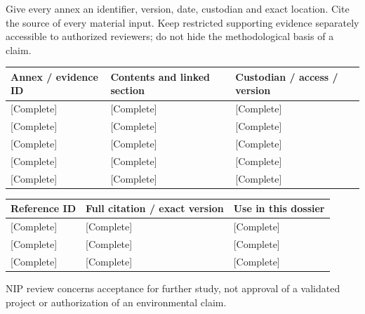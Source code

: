 \begin{Notice}Give every annex an identifier, version, date, custodian and exact location. Cite the source of every material input. Keep restricted supporting evidence separately accessible to authorized reviewers; do not hide the methodological basis of a claim.\end{Notice}
{\sffamily\fontsize{8.3}{10.3}\selectfont\begin{longtable}{@{}P{39.59mm} P{75.89mm} P{49.49mm}@{}}
\toprule
\textbf{Annex / evidence ID} & \textbf{Contents and linked section} & \textbf{Custodian / access / version}\\\midrule\endhead
\rule{0pt}{7.7mm}[Complete] & [Complete] & [Complete]\\\hline
\rule{0pt}{7.7mm}[Complete] & [Complete] & [Complete]\\\hline
\rule{0pt}{7.7mm}[Complete] & [Complete] & [Complete]\\\hline
\rule{0pt}{7.7mm}[Complete] & [Complete] & [Complete]\\\hline
\rule{0pt}{7.7mm}[Complete] & [Complete] & [Complete]\\\hline
\end{longtable}}
{\sffamily\fontsize{8.3}{10.3}\selectfont\begin{longtable}{@{}P{29.69mm} P{82.48mm} P{52.79mm}@{}}
\toprule
\textbf{Reference ID} & \textbf{Full citation / exact version} & \textbf{Use in this dossier}\\\midrule\endhead
\rule{0pt}{7.7mm}[Complete] & [Complete] & [Complete]\\\hline
\rule{0pt}{7.7mm}[Complete] & [Complete] & [Complete]\\\hline
\rule{0pt}{7.7mm}[Complete] & [Complete] & [Complete]\\\hline
\end{longtable}}
\begin{Notice}NIP review concerns acceptance for further study, not approval of a validated project or authorization of an environmental claim.\end{Notice}
